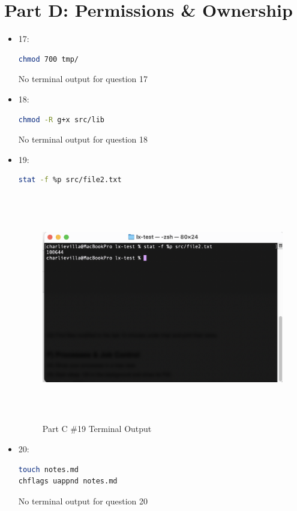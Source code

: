 \section{Part D: Permissions \& Ownership}
\begin{itemize}
    \item 17: 
        \begin{lstlisting}[language=Bash]
chmod 700 tmp/
        \end{lstlisting}

        No terminal output for question 17
    \item 18: 
        \begin{lstlisting}[language=Bash]
chmod -R g+x src/lib
        \end{lstlisting}

        No terminal output for question 18
    \item 19: 
    \begin{lstlisting}[language=Bash]
stat -f %p src/file2.txt
    \end{lstlisting}

    \begin{figure}[H]
        \centering
        \includegraphics[width=15cm, height=10cm]{png/LinuxProblemSetPicsPNG/part_d_19.png}
        \caption{Part C \#19 Terminal Output}
        \label{fig:partC 19}
    \end{figure}
    \item 20: 
    \begin{lstlisting}[language=Bash]
touch notes.md
chflags uappnd notes.md
    \end{lstlisting}

    No terminal output for question 20
\end{itemize}

